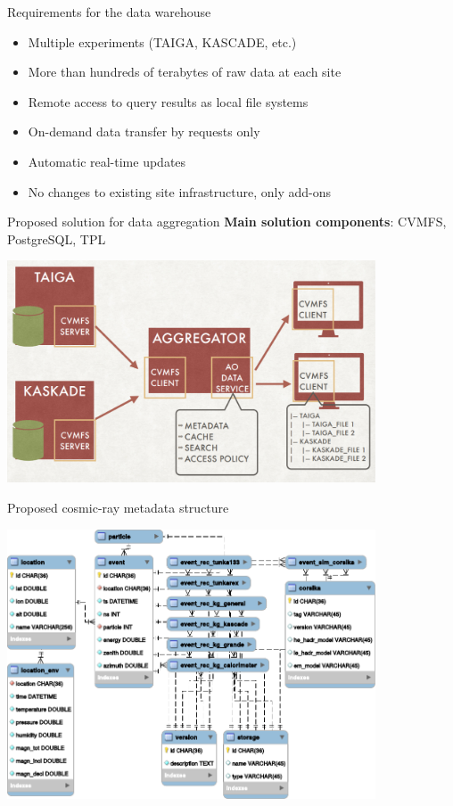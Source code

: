 
\begin{frame}{Requirements for the data warehouse}
 \begin{itemize}
    \item Multiple experiments (TAIGA, KASCADE, etc.)
    \item More than hundreds of terabytes of raw data at each site
    \item Remote access to query results as local file systems
    \item  On-demand data transfer by requests only
    \item  Automatic real-time updates
    \item  No changes to existing site infrastructure, only add-ons
 \end{itemize}
\end{frame}

\begin{frame}{Proposed solution for data aggregation}
\textbf{Main solution components}: CVMFS, PostgreSQL, TPL
    \begin{center}
        \includegraphics[width=0.82\textwidth]{pics/agr.pdf}
    \end{center}

\end{frame}


\begin{frame}{Proposed cosmic-ray metadata structure}
    \vspace{-1.5em}
    \begin{center}
        \includegraphics[width=0.82\textwidth]{pics/metadata.pdf}
    \end{center}
\end{frame}

